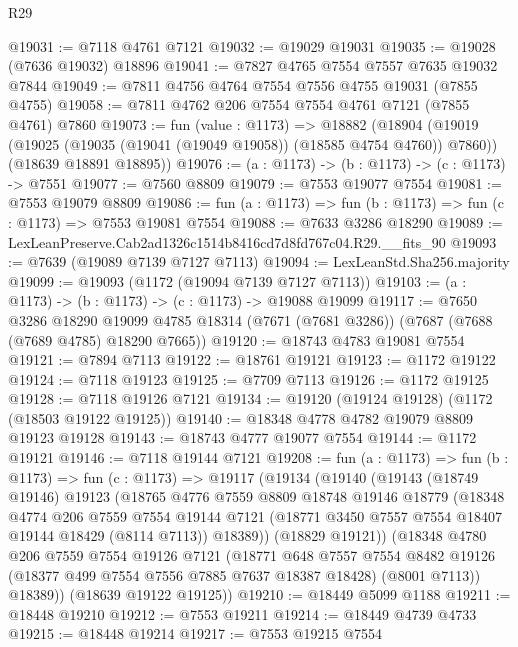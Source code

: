 \begin{lexlean}{R29}
\begin{coremodule}
@19031 := @7118 @4761 @7121
@19032 := @19029 @19031
@19035 := @19028 (@7636 @19032) @18896
@19041 := @7827 @4765 @7554 @7557 @7635 @19032 @7844
@19049 := @7811 @4756 @4764 @7554 @7556 @4755 @19031 (@7855 @4755)
@19058 := @7811 @4762 @206 @7554 @7554 @4761 @7121 (@7855 @4761) @7860
@19073 := fun (value : @1173) =>
  @18882
    (@18904
      (@19019 (@19025 (@19035 (@19041 (@19049 @19058)) (@18585 @4754 @4760)) @7860))
      (@18639 @18891 @18895))
@19076 := (a : @1173) -> (b : @1173) -> (c : @1173) -> @7551
@19077 := @7560 @8809
@19079 := @7553 @19077 @7554
@19081 := @7553 @19079 @8809
@19086 := fun (a : @1173) => fun (b : @1173) => fun (c : @1173) => @7553 @19081 @7554
@19088 := @7633 @3286 @18290
@19089 := LexLeanPreserve.Cab2ad1326c1514b8416cd7d8fd767c04.R29.__fits_90
@19093 := @7639 (@19089 @7139 @7127 @7113)
@19094 := LexLeanStd.Sha256.majority
@19099 := @19093 (@1172 (@19094 @7139 @7127 @7113))
@19103 := (a : @1173) -> (b : @1173) -> (c : @1173) -> @19088 @19099
@19117 := @7650
    @3286
    @18290
    @19099
    @4785
    @18314
    (@7671 (@7681 @3286))
    (@7687 (@7688 (@7689 @4785) @18290 @7665))
@19120 := @18743 @4783 @19081 @7554
@19121 := @7894 @7113
@19122 := @18761 @19121
@19123 := @1172 @19122
@19124 := @7118 @19123
@19125 := @7709 @7113
@19126 := @1172 @19125
@19128 := @7118 @19126 @7121
@19134 := @19120 (@19124 @19128) (@1172 (@18503 @19122 @19125))
@19140 := @18348 @4778 @4782 @19079 @8809 @19123 @19128
@19143 := @18743 @4777 @19077 @7554
@19144 := @1172 @19121
@19146 := @7118 @19144 @7121
@19208 := fun (a : @1173) =>
  fun (b : @1173) =>
  fun (c : @1173) =>
  @19117
    (@19134
      (@19140
        (@19143
          (@18749 @19146)
          @19123
          (@18765
            @4776
            @7559
            @8809
            @18748
            @19146
            @18779
            (@18348
              @4774
              @206
              @7559
              @7554
              @19144
              @7121
              (@18771 @3450 @7557 @7554 @18407 @19144 @18429 (@8114 @7113))
              @18389))
          (@18829 @19121))
        (@18348
          @4780
          @206
          @7559
          @7554
          @19126
          @7121
          (@18771
            @648
            @7557
            @7554
            @8482
            @19126
            (@18377 @499 @7554 @7556 @7885 @7637 @18387 @18428)
            (@8001 @7113))
          @18389))
      (@18639 @19122 @19125))
@19210 := @18449 @5099 @1188
@19211 := @18448 @19210
@19212 := @7553 @19211
@19214 := @18449 @4739 @4733
@19215 := @18448 @19214
@19217 := @7553 @19215 @7554

\end{coremodule}
\end{lexlean}
